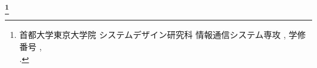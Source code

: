 \newpage
\begin{center}
 \renewcommand{\thefootnote}{\fnsymbol{footnote}}
 \Large\bfseries \jtitle \footnote[1]{首都大学東京大学院 システムデザイン研究科 情報通信システム専攻 \jdoctitle, 学修番号 \studentnumber,\\ \jdate.}
 \renewcommand{\thefootnote}{\arabic{footnote}}
\end{center}

\vspace*{1truemm}

\begin{center}
 \large\jauthor
\end{center}

\vspace*{1truemm}

\begin{center}
\end{center}

\vspace*{2truemm}
\par
\jabstract
\vspace*{5truemm}


